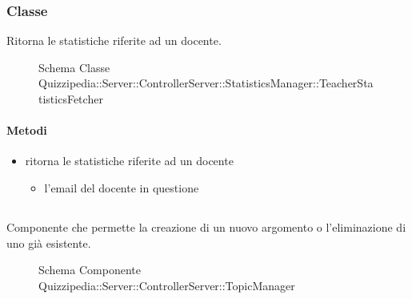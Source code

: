 \subsubsection{Classe }
Ritorna le statistiche riferite ad un docente.
\begin{figure}[H]
\centering
\noindent{}
\caption[Schema Classe TeacherStatisticsFetcher]{Schema Classe Quizzipedia::Server::ControllerServer::StatisticsManager::TeacherStatisticsFetcher}
\end{figure}
\paragraph{Metodi}
\begin{itemize}
\item {}
\newline
ritorna le statistiche riferite ad un docente
\newline
{}
\newline
\begin{itemize}
\item {}
\newline
l'email del docente in questione
\end{itemize}
\end{itemize}
\subsection{}
Componente che permette la creazione di un nuovo argomento o l'eliminazione di uno già esistente.
\begin{figure}[H]
\centering
\noindent{}
\caption[Schema Componente Quizzipedia::Server::ControllerServer::TopicManager]{Schema Componente Quizzipedia::Server::ControllerServer::TopicManager}
\end{figure}
